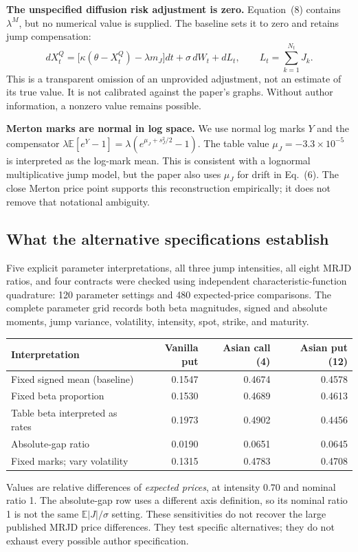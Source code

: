 \documentclass[11pt,a4paper]{article}
\newcommand{\E}{\mathbb{E}}
\begin{document}
\textbf{The unspecified diffusion risk adjustment is zero.} Equation~(8)
contains $\lambda^M$, but no numerical value is supplied. The baseline
sets it to zero and retains jump compensation:
\[
dX_t^Q=\bigl[\kappa(\theta-X_t^Q)-\lambda m_J\bigr]dt
+\sigma\,dW_t+dL_t,
\qquad L_t=\sum_{k=1}^{N_t}J_k.
\]
This is a transparent omission of an unprovided adjustment, not an
estimate of its true value. It is not calibrated against the paper's
graphs. Without author information, a nonzero value remains possible.

\textbf{Merton marks are normal in log space.} We use normal log marks
$Y$ and the compensator
$\lambda\E[e^Y-1]=\lambda(e^{\mu_J+s_J^2/2}-1)$.
The table value $\mu_J=-3.3\times10^{-5}$ is interpreted as the log-mark
mean. This is consistent with a lognormal multiplicative jump model,
but the paper also uses $\mu_J$ for drift in Eq.~(6). The close Merton
price point supports this reconstruction empirically; it does not
remove that notational ambiguity.

\subsection{What the alternative specifications establish}
Five explicit parameter interpretations, all three jump intensities,
all eight MRJD ratios, and four contracts were checked using independent
characteristic-function quadrature: 120 parameter settings and 480
expected-price comparisons. The complete parameter grid records both
beta magnitudes, signed and absolute moments, jump variance, volatility,
intensity, spot, strike, and maturity.

\begin{center}\small
\begin{tabular}{@{}lrrr@{}}
\toprule
Interpretation & Vanilla put & Asian call (4) & Asian put (12)\\
\midrule
Fixed signed mean (baseline) & 0.1547 & 0.4674 & 0.4578 \\
Fixed beta proportion & 0.1530 & 0.4689 & 0.4613 \\
Table beta interpreted as rates & 0.1973 & 0.4902 & 0.4456 \\
Absolute-gap ratio & 0.0190 & 0.0651 & 0.0645 \\
Fixed marks; vary volatility & 0.1315 & 0.4783 & 0.4708 \\
\bottomrule
\end{tabular}
\end{center}
Values are relative differences of \emph{expected prices}, at intensity
$0.70$ and nominal ratio 1. The absolute-gap row uses a different axis
definition, so its nominal ratio 1 is not the same $\E|J|/\sigma$ setting.
These sensitivities do not recover the large published MRJD price
differences. They test specific alternatives; they do not exhaust every
possible author specification.
\end{document}
